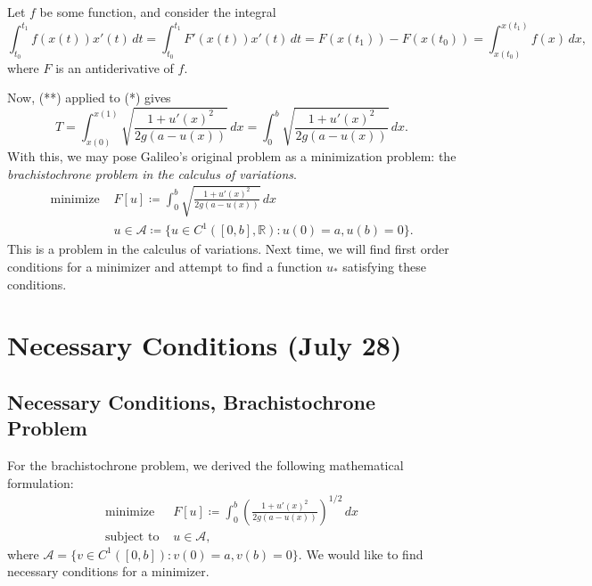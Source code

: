 \documentclass[11pt]{article}
\newcommand{\R}{\mathbb{R}}
\begin{document}
Let $f$ be some function, and consider the integral
\[
\tag{**}
\int_{t_0}^{t_1} f(x(t))x'(t) \, dt = \int_{t_0}^{t_1} F'(x(t))x'(t) \, dt = F(x(t_1)) - F(x(t_0)) = \int_{x(t_0)}^{x(t_1)} f(x) \, dx,
\]
where $F$ is an antiderivative of $f$. 

Now, (**) applied to (*) gives
\[
T = \int_{x(0)}^{x(1)} \sqrt{\frac{1 + u'(x)^2}{2g(a - u(x))}} \, dx =  \int_{0}^{b} \sqrt{\frac{1 + u'(x)^2}{2g(a - u(x))}} \, dx.
\]
With this, we may pose Galileo's original problem as a minimization problem: the \emph{brachistochrone problem in the calculus of variations}.
\begin{align*}
\text{minimize } &F[u] \coloneqq \int_{0}^{b} \sqrt{\frac{1 + u'(x)^2}{2g(a - u(x))}} \, dx \\
& u \in \mathcal{A} \coloneqq \{ u \in C^1([0,b], \R) : u(0) = a, u(b) = 0 \}.
\end{align*}
This is a problem in the calculus of variations. Next time, we will find first order conditions for a minimizer and attempt to find a function $u_*$ satisfying these conditions.

\newpage

\section{Necessary Conditions (July 28)}

\subsection{Necessary Conditions, Brachistochrone Problem}

For the brachistochrone problem, we derived the following mathematical formulation:
\begin{align*}
\text{minimize } & F[u] \coloneqq \int_0^b \left( \frac{1 + u'(x)^2}{2g(a-u(x))} \right)^{1/2} \, dx \\
\text{subject to } &u \in \mathcal{A},
\end{align*}
where $\mathcal{A} = \{ v \in C^1([0,b]) : v(0) = a, v(b) = 0 \}$. We would like to find necessary conditions for a minimizer.
\end{document}
